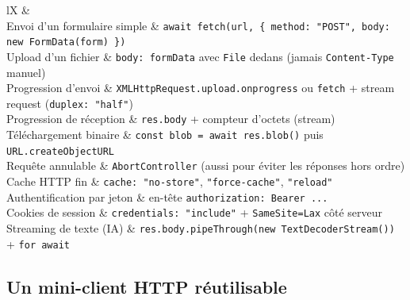 \begin{tabz}{lX}
  \headrow {} \&  \\
  \midrule
  Envoi d'un formulaire simple \& \verb|await fetch(url, { method: "POST", body: new FormData(form) })| \\
  Upload d'un fichier \& \verb|body: formData| avec \verb|File| dedans (jamais \verb|Content-Type| manuel) \\
  Progression d'envoi \& \verb|XMLHttpRequest.upload.onprogress| ou \verb|fetch| + stream request (\verb|duplex: "half"|) \\
  Progression de r\'eception \& \verb|res.body| + compteur d'octets (stream) \\
  T\'el\'echargement binaire \& \verb|const blob = await res.blob()| puis \verb|URL.createObjectURL| \\
  Requ\^ete annulable \& \verb|AbortController| (aussi pour \'eviter les r\'eponses hors ordre) \\
  Cache HTTP fin \& \verb|cache: "no-store"|, \verb|"force-cache"|, \verb|"reload"| \\
  Authentification par jeton \& en-t\^ete \verb|authorization: Bearer ...| \\
  Cookies de session \& \verb|credentials: "include"| + \verb|SameSite=Lax| c\^ot\'e serveur \\
  Streaming de texte (IA) \& \verb|res.body.pipeThrough(new TextDecoderStream())| + \verb|for await| \\
\end{tabz}

\subsection{Un mini-client HTTP r\'eutilisable}

